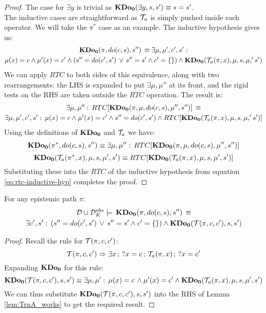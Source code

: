 \begin{proof}
The case for $\exists y$ is trivial as $\mathbf{KDo_{0}}(\exists y,s,s')\equiv s=s'$.\\


The inductive cases are straightforward as $\mathcal{T}_{a}$ is simply pushed
inside each operator. We will take the $\pi^{*}$ case as an example.
The inductive hypothesis gives us:\begin{multline*}
\mathbf{KDo_{0}}(\pi,do(c,s),s'')\,\equiv\exists\mu,\mu',c',s':\\
\mu(x)=c\wedge\mu'(x)=c'\wedge\left(s''=do(c',s')\,\vee\, s''=s'\wedge c'=\{\}\right)\wedge\mathbf{KDo_{0}}(\mathcal{T}_{a}(\pi,x),\mu,s,\mu,'s')\end{multline*}
We can apply $RTC$ to both sides of this equivalence, along with
two rearrangements: the LHS is expanded to put $\exists\mu,\mu''$
at its front, and the rigid tests on the RHS are taken outside the
$RTC$ operation. The result is:\begin{multline}
\exists\mu,\mu'':\, RTC[\mathbf{KDo_{0}}(\pi,\mu,do(c,s),\mu'',s'')]\,\equiv\\
\exists\mu,\mu',c',s':\,\mu(x)=c\wedge\mu'(x)=c'\wedge s''=do(c',s')\wedge RTC[\mathbf{KDo_{0}}(\mathcal{T}_{a}(\pi,x),\mu,s,\mu,'s')]\label{eq:rtc-inductive-hyp}\end{multline}
Using the definitions of $\mathbf{KDo_{0}}$ and $\mathcal{T}_{a}$ we have:\[
\mathbf{KDo_{0}}(\pi^{*},do(c,s),s'')\equiv\exists\mu,\mu'':\, RTC[\mathbf{KDo_{0}}(\pi,\mu,do(c,s),\mu'',s'')]\]
\[
\mathbf{KDo_{0}}(\mathcal{T}_{a}(\pi^{*},x),\mu,s,\mu',s')\equiv RTC[\mathbf{KDo_{0}}(\mathcal{T}_{a}(\pi,x),\mu,s,\mu',s')]\]
Substituting these into the $RTC$ of the inductive hypothesis from
equation \eqref{eq:rtc-inductive-hyp} completes the proof.
\end{proof}
\medskip{}


\begin{thmext}
[{\ref{thm:Trn-respects-epi-paths}}] For any epistemic path $\pi$:\begin{multline*}
\mathcal{D}\cup\mathcal{D}_{K}^{obs}\models\,\mathbf{KDo_{0}}(\pi,do(c,s),s'')\,\equiv\\
\exists c',s':\,\left(s''=do(c',s')\,\vee\, s''=s'\wedge c'=\{\}\right)\wedge\mathbf{KDo_{0}}(\mathcal{T}(\pi,c,c'),s,s')\end{multline*}

\end{thmext}
\begin{proof}
Recall the rule for $\mathcal{T}(\pi,c,c')$:\[
\mathcal{T}(\pi,c,c')\Rightarrow\exists x\,;\,?x=c\,;\,\mathcal{T}_{a}(\pi,x)\,;\,?x=c'\]
Expanding $\mathbf{KDo_{0}}$ for this rule:\[
\mathbf{KDo_{0}}(\mathcal{T}(\pi,c,c'),s,s')\equiv\exists\mu,\mu':\,\mu(x)=c\,\wedge\mu'(x)=c'\wedge\mathbf{KDo_{0}}(\mathcal{T}_{a}(\pi,x),\mu,s,\mu',s')\]
We can thus substitute $\mathbf{KDo_{0}}(\mathcal{T}(\pi,c,c'),s,s')$ into the RHS of
Lemma \ref{lem:TrnA_works} to get the required result.
\end{proof}
\medskip{}


